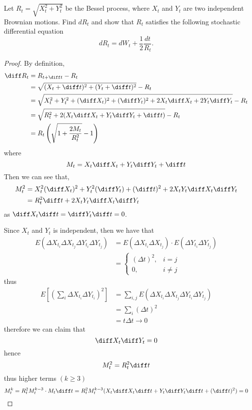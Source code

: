     \problem
    \begin{question}
        Let $R_t=\sqrt{X^2_t+Y^2_t}$ be the Bessel process, where $X_t$ and $Y_t$
        are two independent Brownian motions.  Find $dR_t$ and show that $R_t$
        satisfies the following stochastic differential equation
        \[dR_t=dW_t+\frac{1}{2}\frac{dt}{R_t}.\]
    \end{question}
    \begin{proof}
        By definition,
        \[\begin{aligned}
            \diff R_t&=R_{t+\diff t}-R_t\\
            &=\sqrt{(X_t+\diff t)^2+(Y_t+\diff t)^2}-R_t\\
            &=\sqrt{X_t^2+Y_t^2+(\diff X_t)^2+(\diff Y_t)^2
            +2X_t\diff X_t+2Y_t\diff Y_t}-R_t\\
            &=\sqrt{R_t^2+2(X_t\diff X_t+Y_t\diff Y_t+\diff t)}-R_t\\
            &=R_t\left(\sqrt{1+\frac{2M_t}{R_t^2}}-1\right)
        \end{aligned}\]
        where
        \[M_t=X_t\diff X_t+Y_t\diff Y_t+\diff t\]
        Then we can see that,
        \[\begin{aligned}
            M_t^2&=X_t^2(\diff X_t)^2+Y_t^2(\diff Y_t)+(\diff t)^2
            +2X_tY_t\diff X_t\diff Y_t\\
            &=R_t^2\diff t+2X_tY_t\diff X_t\diff Y_t
        \end{aligned}\]
        as $\diff X_t\diff t=\diff Y_t\diff t=0$.

        Since $X_t$ and $Y_t$ is independent, then we have that
        \[\begin{aligned}
            E\left(\Delta X_{t_i}\Delta X_{t_j}
                   \Delta Y_{t_i}\Delta Y_{t_j}\right)
            &=E\left(\Delta X_{t_i}\Delta X_{t_j}\right)\cdot
              E\left(\Delta Y_{t_i}\Delta Y_{t_j}\right)\\
            &=\begin{cases}
                (\Delta t)^2,&i=j\\
                0,&i\neq j
            \end{cases}
        \end{aligned}\]
        thus
        \[\begin{aligned}
            E\left[\left(\sum_i\Delta X_{t_i}\Delta Y_{t_i}\right)^2\right]
            &=\sum_{i,j}
            E\left(\Delta X_{t_i}\Delta X_{t_j}
                   \Delta Y_{t_i}\Delta Y_{t_j}\right)\\
            &=\sum_{i}(\Delta t)^2\\
            &=t\Delta t\to 0
        \end{aligned}\]
        therefore we can claim that
        \[\diff X_t\diff Y_t=0\]
        hence
        \begin{equation}
            \label{eq:magic equation}
            M_t^2=R_t^2\diff t
        \end{equation}
        thus higher terms $(k\geq 3)$
        \[M_t^k=R_t^2M_t^{k-3}\cdot M_t\diff t
        =R_t^2M_t^{k-3}(X_t\diff X_t\diff t+Y_t\diff Y_t\diff t+(\diff t)^2)
        =0\]


\end{proof}
